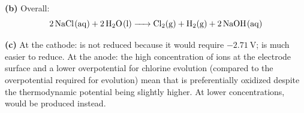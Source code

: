 \documentclass[addpoints]{exam}
\begin{document}
\begin{questions}
\begin{solution}[10cm]
\textbf{(b)} Overall:
\[
\ce{2NaCl(aq) + 2H2O(l) -> Cl2(g) + H2(g) + 2NaOH(aq)}
\]

\textbf{(c)} At the cathode:  is not reduced because it would require $-2.71\ \text{V}$;
 is much easier to reduce. At the anode: the high concentration of  ions
at the electrode surface and a lower overpotential for chlorine evolution (compared to the
overpotential required for  evolution) mean that  is preferentially oxidized
despite the thermodynamic potential being slightly higher. At lower  concentrations,
 would be produced instead.
\end{solution}

\end{questions}
\end{document}
